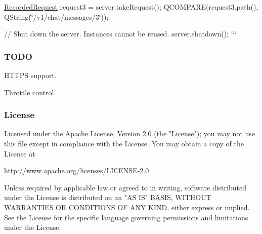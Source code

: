 \hyperlink{class_recorded_request}{Recorded\+Request} request3 = server.\+take\+Request(); Q\+C\+O\+M\+P\+A\+R\+E(request3.\+path(), Q\+String(\char`\"{}/v1/chat/messages/3\char`\"{}));

// Shut down the server. Instances cannot be reused. server.\+shutdown(); ```

\subsubsection*{T\+O\+D\+O}


\begin{DoxyItemize}
\item H\+T\+T\+P\+S support.
\item Throttle control.
\end{DoxyItemize}

\subsubsection*{License}

\begin{DoxyVerb}Licensed under the Apache License, Version 2.0 (the "License");
you may not use this file except in compliance with the License.
You may obtain a copy of the License at

   http://www.apache.org/licenses/LICENSE-2.0

Unless required by applicable law or agreed to in writing, software
distributed under the License is distributed on an "AS IS" BASIS,
WITHOUT WARRANTIES OR CONDITIONS OF ANY KIND, either express or implied.
See the License for the specific language governing permissions and
limitations under the License.\end{DoxyVerb}
 